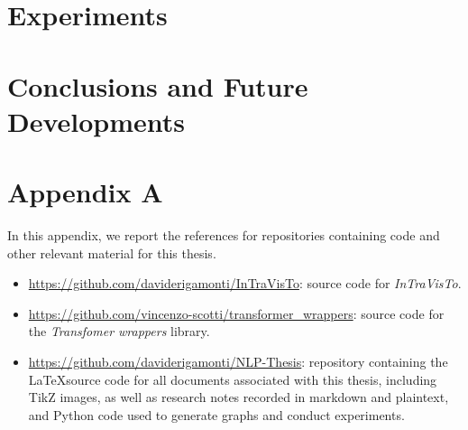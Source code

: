\documentclass{Configuration_Files/PoliMi3i_thesis}
\begin{document}
\chapter{Experiments}\label{ch:experiments}


\chapter{Conclusions and Future Developments}\label{ch:conclusions}





\cleardoublepage
{} %
\appendix
\chapter{Appendix A}
In this appendix, we report the references for repositories containing code and other relevant material for this thesis.
\begin{itemize}
	\item \url{https://github.com/daviderigamonti/InTraVisTo}: source code for \emph{InTraVisTo}.
	\item \url{https://github.com/vincenzo-scotti/transformer_wrappers}: source code for the \emph{Transfomer wrappers} library.
	\item \url{https://github.com/daviderigamonti/NLP-Thesis}: repository containing the \LaTeX source code for all documents associated with this thesis, including TikZ images, as well as research notes recorded in markdown and plaintext, and Python code used to generate graphs and conduct experiments.
\end{itemize}


\listoffigures

\listoftables
\end{document}
